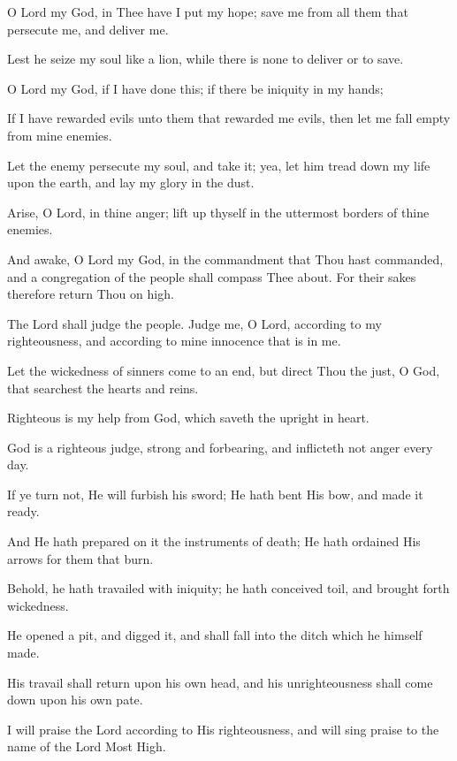 O Lord my God, in Thee have I put my hope; save me from all them that persecute me, and deliver me.

Lest he seize my soul like a lion, while there is none to deliver or to save.

O Lord my God, if I have done this; if there be iniquity in my hands;

If I have rewarded evils unto them that rewarded me evils, then let me fall empty from mine enemies.

Let the enemy persecute my soul, and take it; yea, let him tread down my life upon the earth, and lay my glory in the dust.

Arise, O Lord, in thine anger; lift up thyself in the uttermost borders of thine enemies.

And awake, O Lord my God, in the commandment that Thou hast commanded, and a congregation of the people shall compass Thee about. For their sakes therefore return Thou on high.

The Lord shall judge the people. Judge me, O Lord, according to my righteousness, and according to mine innocence that is in me.

Let the wickedness of sinners come to an end, but direct Thou the just, O God, that searchest the hearts and reins.

Righteous is my help from God, which saveth the upright in heart.

God is a righteous judge, strong and forbearing, and inflicteth not anger every day.

If ye turn not, He will furbish his sword; He hath bent His bow, and made it ready.

And He hath prepared on it the instruments of death; He hath ordained His arrows for them that burn.

Behold, he hath travailed with iniquity; he hath conceived toil, and brought forth wickedness.

He opened a pit, and digged it, and shall fall into the ditch which he himself made.

His travail shall return upon his own head, and his unrighteousness shall come down upon his own pate.

I will praise the Lord according to His righteousness, and will sing praise to the name of the Lord Most High.
